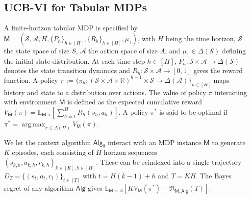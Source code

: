 \documentclass[10pt]{article}
\DeclareMathOperator*{\argmax}{arg\,max}
\newcommand{\<}{\left\langle}
\renewcommand{\>}{\right\rangle}
\newcommand{\E}{\mathbb{E}}
\newcommand{\R}{\mathbb{R}}
\newcommand{\inst}{{\mathsf{M}}}
\newcommand{\state}{{s}}
\newcommand{\action}{{a}}
\newcommand{\reward}{{r}}
\newcommand{\totlen}{{T}} %
\newcommand{\sAlg}{{\mathsf{Alg}}}
\newcommand{\dset}{{D}}
\newcommand{\plc}{{\pi}}
\newcommand{\plcset}{{\Pi}}
\newcommand{\optplc}{{\pi^*}}
\newcommand{\prior}{{\Lambda}}
\newcommand{\Numepi}{{K}}
\newcommand{\horizon}{{H}}
\newcommand{\statesp}{{\mathcal{S}}}
\newcommand{\actionsp}{{\mathcal{A}}}
\renewcommand{\horizon}{{H}}
\newcommand{\transit}{{P}}
\newcommand{\rewardfun}{{R}}
\newcommand{\init}{{\mu_1}}
\newcommand{\valuefun}{{V}}
\newcommand{\totreward}{{\mathfrak{R}}}  %
\newcommand{\Numst}{{S}}
\newcommand{\Numact}{{A}}
\newcommand{\Vfun}{{\valuefun}}
\begin{document}
\subsection{UCB-VI for Tabular MDPs}\label{sec:Tabular-MDP-statement}


A finite-horizon tabular MDP is specified by $\inst=(\statesp,\actionsp, \horizon, \{\transit_h\}_{h\in[\horizon]},\{\rewardfun_h\}_{h\in[\horizon]},\init)$, with $\horizon$ being the time horizon, $\statesp$ the state space of size $\Numst$, $\actionsp$ the action space of size $\Numact$, and $\init\in\Delta(\statesp)$ defining the initial state distribution. At each time step $h\in[\horizon]$, $\transit_h: \statesp\times\actionsp \to \Delta(\statesp)$ denotes the state transition dynamics and $\rewardfun_h:\statesp \times \actionsp \to [0,1]$ gives the reward function. A policy $\plc:=\{\plc_h:(\statesp \times\actionsp \times \R)^{h-1}\times\statesp \to\Delta(\actionsp)\}_{h \in [\horizon]}$ maps history and state to a distribution over actions. The value of policy $\pi$ interacting with environment $\inst$ is defined as the expected cumulative reward $\valuefun_\inst(\plc)=\E_{\inst,\plc}[\sum_{h=1}^\horizon \rewardfun_h (\state_h,\action_h)]$. A policy $\optplc$ is said to be optimal if $\optplc=\argmax_{\pi\in\Delta(\plcset)}\valuefun_\inst(\pi)$. 


We let the context algorithm $\sAlg_0$ interact with an MDP instance $\inst$ to generate $\Numepi$ episodes, each consisting of $\horizon$ horizon sequences $ (\state_{k,h},\action_{k,h},\reward_{k,h})_{k \in [\Numepi], h \in [\horizon]}$. These can be reindexed into a single trajectory $\dset_{\totlen} = \{ (\state_t,\action_t,\reward_t) \}_{t \in [\totlen]}$ with $t=H(k-1)+h$ and $\totlen=\Numepi\horizon$. The Bayes regret of any algorithm $\sAlg$ gives $\E_{\inst\sim\prior}[\Numepi\Vfun_\inst(\plc^*)-\totreward_{\inst,\sAlg}(\totlen)]$. 

\end{document}
